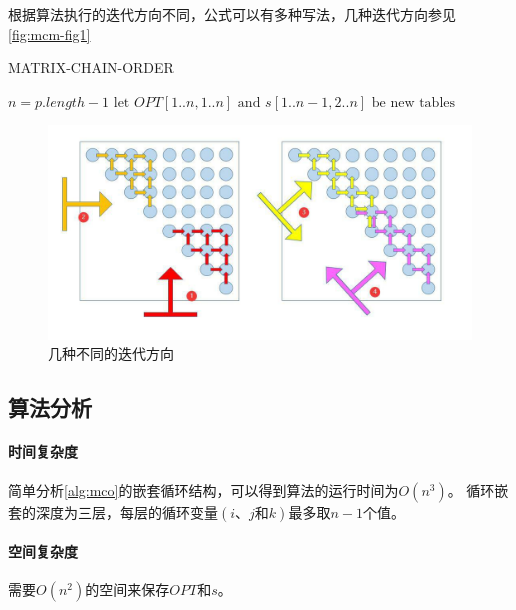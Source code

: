 \begin{remark}
  根据算法执行的迭代方向不同，公式可以有多种写法，几种迭代方向参见\autoref{fig:mcm-fig1}
\end{remark}

\begin{algorithm}
  \caption{MATRIX-CHAIN-ORDER}\label{alg:mco}
  \BlankLine{}
  $n = p.length-1$\;
  $\text{let } OPT[1..n, 1..n] \text{ and } s[1..n-1, 2..n] \text{ be new tables}$\;
\end{algorithm}

\begin{figure}[hbt!]
  \centering
  \includegraphics[scale=0.6]{image/dynamic-programming-1.png}
  \caption{几种不同的迭代方向}\label{fig:mcm-fig1}
\end{figure}

\subsection{算法分析}
\paragraph*{时间复杂度}
简单分析\autoref{alg:mco}的嵌套循环结构，可以得到算法的运行时间为$O(n^3)$。
循环嵌套的深度为三层，每层的循环变量$(i\text{、}j\text{和}k)$最多取$n-1$个值。
\paragraph*{空间复杂度}
需要$O(n^2)$的空间来保存$OPT$和$s$。

